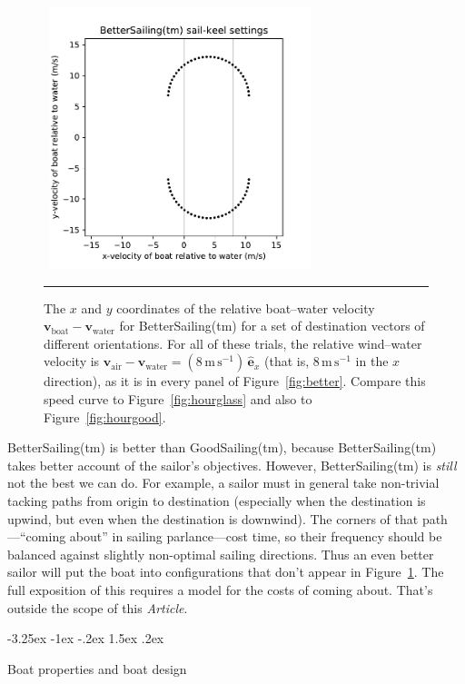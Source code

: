 \documentclass[letterpaper]{article}
\makeatletter
\renewcommand{\vec}[1]{\boldsymbol{#1}}
\newcommand{\uvec}{\vec{\hat{e}}}
\newcommand{\air}{\text{air}}
\newcommand{\water}{\text{water}}
\newcommand{\boat}{\text{boat}}
\newcommand{\vair}{\vec{v}_\air}
\newcommand{\vwater}{\vec{v}_\water}
\newcommand{\vboat}{\vec{v}_\boat}
\newcommand{\mps}{\mathrm{m\,s^{-1}}}
\newcommand{\documentname}{\textsl{Article}}
\newcommand{\figref}[1]{Figure~\ref{#1}}
\renewcommand\section{\@startsection {section}{1}{\z@}%
  {-3.25ex \@plus -1ex \@minus -.2ex}%
  {1.5ex \@plus .2ex}%
  {\raggedright\normalfont\large\bfseries}}
\newcommand{\figurerule}{\rule[1ex]{\textwidth}{0.2pt}}
\makeatother
\begin{document}
\begin{figure}[t!]
  ~\hfill\includegraphics[width=3in]{hourglass-better.pdf}\hfill~
  \caption{The $x$ and $y$ coordinates of the relative boat--water velocity $\vboat-\vwater$ for BetterSailing(tm) for a set of destination vectors of different orientations.
  For all of these trials, the relative wind--water velocity is $\vair-\vwater=(8\,\mps)\,\uvec_x$ (that is, $8\,\mps$ in the $x$ direction), as it is in every panel of \figref{fig:better}.
  Compare this speed curve to \figref{fig:hourglass} and also to \figref{fig:hourgood}.\label{fig:hourbetter}}
  \figurerule
\end{figure}

BetterSailing(tm) is better than GoodSailing(tm), because BetterSailing(tm) takes better account of the sailor's objectives.
However, BetterSailing(tm) is \emph{still} not the best we can do.
For example, a sailor must in general take non-trivial tacking paths from origin to destination (especially when the destination is upwind, but even when the destination is downwind).
The corners of that path---``coming about'' in sailing parlance---cost time, so their frequency should be balanced against slightly non-optimal sailing directions.
Thus an even better sailor will put the boat into configurations that don't appear in \figref{fig:hourbetter}.
The full exposition of this requires a model for the costs of coming about.
That's outside the scope of this \documentname.

\section{Boat properties and boat design}\label{sec:design}
\end{document}
